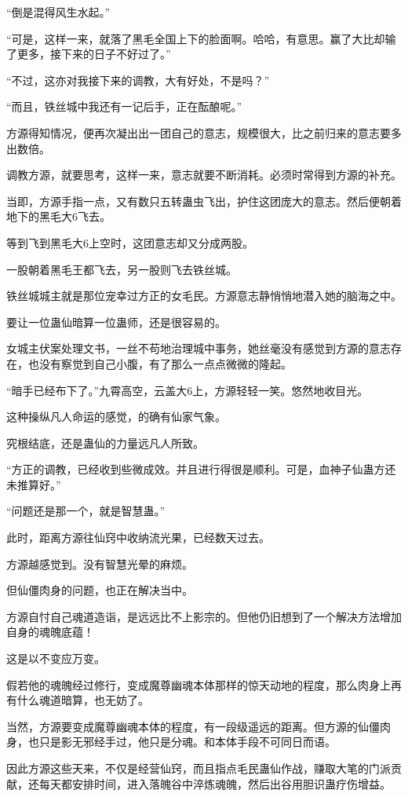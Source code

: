 \begin{this_body}
“倒是混得风生水起。”

“可是，这样一来，就落了黑毛全国上下的脸面啊。哈哈，有意思。赢了大比却输了更多，接下来的日子不好过了。”

“不过，这亦对我接下来的调教，大有好处，不是吗？”

“而且，铁丝城中我还有一记后手，正在酝酿呢。”

方源得知情况，便再次凝出出一团自己的意志，规模很大，比之前归来的意志要多出数倍。

调教方源，就要思考，这样一来，意志就要不断消耗。必须时常得到方源的补充。

当即，方源手指一点，又有数只五转蛊虫飞出，护住这团庞大的意志。然后便朝着地下的黑毛大6飞去。

等到飞到黑毛大6上空时，这团意志却又分成两股。

一股朝着黑毛王都飞去，另一股则飞去铁丝城。

铁丝城城主就是那位宠幸过方正的女毛民。方源意志静悄悄地潜入她的脑海之中。

要让一位蛊仙暗算一位蛊师，还是很容易的。

女城主伏案处理文书，一丝不苟地治理城中事务，她丝毫没有感觉到方源的意志存在，也没有察觉到自己小腹，有了那么一点点微微的隆起。

“暗手已经布下了。”九霄高空，云盖大6上，方源轻轻一笑。悠然地收目光。

这种操纵凡人命运的感觉，的确有仙家气象。

究根结底，还是蛊仙的力量远凡人所致。

“方正的调教，已经收到些微成效。并且进行得很是顺利。可是，血神子仙蛊方还未推算好。”

“问题还是那一个，就是智慧蛊。”

此时，距离方源往仙窍中收纳流光果，已经数天过去。

方源越感觉到。没有智慧光晕的麻烦。

但仙僵肉身的问题，也正在解决当中。

方源自忖自己魂道造诣，是远远比不上影宗的。但他仍旧想到了一个解决方法增加自身的魂魄底蕴！

这是以不变应万变。

假若他的魂魄经过修行，变成魔尊幽魂本体那样的惊天动地的程度，那么肉身上再有什么魂道暗算，也无妨了。

当然，方源要变成魔尊幽魂本体的程度，有一段级遥远的距离。但方源的仙僵肉身，也只是影无邪经手过，他只是分魂。和本体手段不可同日而语。

因此方源这些天来，不仅是经营仙窍，而且指点毛民蛊仙作战，赚取大笔的门派贡献，还每天都安排时间，进入落魄谷中淬炼魂魄，然后出谷用胆识蛊疗伤增益。


\end{this_body}
